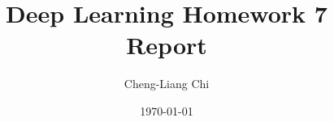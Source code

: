 \documentclass[12pt,a4paper]{article}
\title{Deep Learning Homework 7 Report}
\author{Cheng-Liang Chi}
\date{\today}
\begin{document}
\maketitle

\tableofcontents
\newpage





\nocite{*}
\printbibliography
\end{document}
